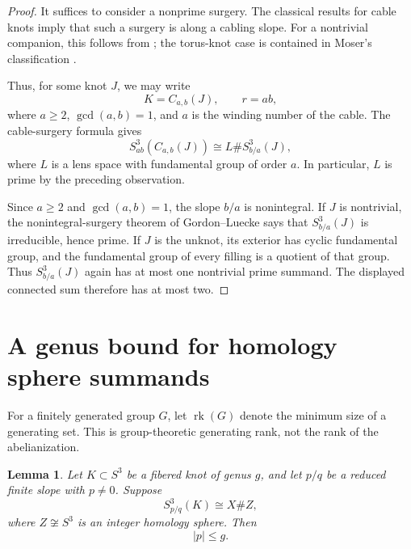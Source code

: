 \documentclass[11pt]{article}
\newcommand{\surg}[2]{S^3_{#1}(#2)}
\DeclareMathOperator{\rk}{rk}
\newtheorem{lemma}[theorem]{Lemma}
\begin{document}
\begin{proof}
It suffices to consider a nonprime surgery.
The classical results for
cable knots imply that such a surgery is along a cabling slope.
For a nontrivial companion, this follows from
\cite[Corollary~4.4 and the proof of Corollary~4.5]{Scharlemann};
the torus-knot case is contained in Moser's classification
\cite{Moser}.

Thus, for some knot \(J\), we may write
\[
    K=C_{a,b}(J),\qquad r=ab,
\]
where \(a\geq 2\), \(\gcd(a,b)=1\), and \(a\) is the winding number
of the cable. The cable-surgery formula
\cite[Corollary~7.3]{Gordon} gives
\[
    \surg{ab}{C_{a,b}(J)}
       \cong L\#\surg{b/a}{J},
\]
where \(L\) is a lens space with fundamental group of order \(a\).
In particular, \(L\) is prime by the preceding observation.


Since \(a\geq 2\) and \(\gcd(a,b)=1\), the slope \(b/a\) is
nonintegral. If \(J\) is nontrivial, the nonintegral-surgery theorem of
Gordon--Luecke \cite{GordonLuecke} says that
\(\surg{b/a}{J}\) is irreducible, hence prime.
If \(J\) is the unknot, its exterior has cyclic fundamental group,
and the fundamental group of every filling is a quotient of that
group. Thus \(\surg{b/a}{J}\) again has at most one nontrivial prime
summand. The displayed connected sum therefore has at most two.
\end{proof}

\section{A genus bound for homology sphere summands}

For a finitely generated group \(G\), let \(\rk(G)\) denote the
minimum size of a generating set. This is group-theoretic generating
rank, not the rank of the abelianization.


\begin{lemma}\label{lem:genus}
Let \(K\subset S^3\) be a fibered knot of genus \(g\), and let
\(p/q\) be a reduced finite slope with \(p\neq 0\).
Suppose
\[
    \surg{p/q}{K}\cong X\# Z,
\]
where \(Z\not\cong S^3\) is an integer homology sphere.
Then
\[
    |p|\leq g.
\]
\end{lemma}
\end{document}
